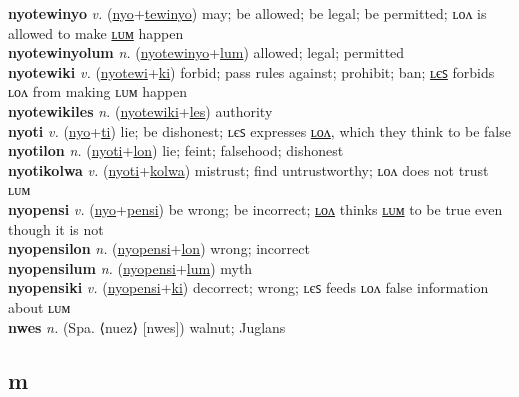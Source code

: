 \textbf{nyotewinyo} \textit{v.} (\hyperref[nyo]{nyo}+\hyperref[tewinyo]{tewinyo})
may; be allowed; be legal; be permitted; ʟᴏᴧ is allowed to make \hyperref[nyotewinyolum]{ʟᴜᴍ} happen \label{nyotewinyo} \\
\textbf{nyotewinyolum} \textit{n.} (\hyperref[nyotewinyo]{nyotewinyo}+\hyperref[lum]{lum})
allowed; legal; permitted \label{nyotewinyolum} \\
\textbf{nyotewiki} \textit{v.} (\hyperref[nyotewi]{nyotewi}+\hyperref[ki]{ki})
forbid; pass rules against; prohibit; ban; \hyperref[nyotewikiles]{ʟєꜱ} forbids ʟᴏᴧ from making ʟᴜᴍ happen \label{nyotewiki} \\
\textbf{nyotewikiles} \textit{n.} (\hyperref[nyotewiki]{nyotewiki}+\hyperref[les]{les})
authority \label{nyotewikiles} \\
\textbf{nyoti} \textit{v.} (\hyperref[nyo]{nyo}+\hyperref[ti]{ti})
lie; be dishonest; ʟєꜱ expresses \hyperref[nyotilon]{ʟᴏᴧ}, which they think to be false \label{nyoti} \\
\textbf{nyotilon} \textit{n.} (\hyperref[nyoti]{nyoti}+\hyperref[lon]{lon})
lie; feint; falsehood; dishonest \label{nyotilon} \\
\textbf{nyotikolwa} \textit{v.} (\hyperref[nyoti]{nyoti}+\hyperref[kolwa]{kolwa})
mistrust; find untrustworthy; ʟᴏᴧ does not trust ʟᴜᴍ \label{nyotikolwa} \\
\textbf{nyopensi} \textit{v.} (\hyperref[nyo]{nyo}+\hyperref[pensi]{pensi})
be wrong; be incorrect; \hyperref[nyopensilon]{ʟᴏᴧ} thinks \hyperref[nyopensilum]{ʟᴜᴍ} to be true even though it is not \label{nyopensi} \\
\textbf{nyopensilon} \textit{n.} (\hyperref[nyopensi]{nyopensi}+\hyperref[lon]{lon})
wrong; incorrect \label{nyopensilon} \\
\textbf{nyopensilum} \textit{n.} (\hyperref[nyopensi]{nyopensi}+\hyperref[lum]{lum})
myth \label{nyopensilum} \\
\textbf{nyopensiki} \textit{v.} (\hyperref[nyopensi]{nyopensi}+\hyperref[ki]{ki})
decorrect; wrong; ʟєꜱ feeds ʟᴏᴧ false information about ʟᴜᴍ \label{nyopensiki} \\
\textbf{nwes} \textit{n.} (Spa. ⟨nuez⟩ [nwes])
walnut; Juglans \label{nwes} \\
\subsection{m}

